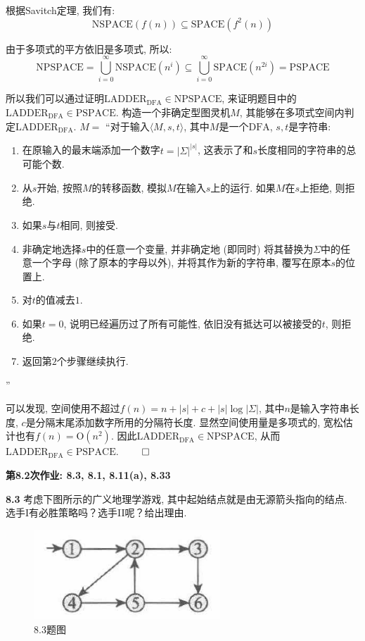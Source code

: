 \documentclass[UTF8]{report}
\newcommand{\problem}[1]{{\setlength{\parskip}{10pt}\noindent \bf{#1}}}
\renewenvironment{proof}{{\setlength{\parskip}{7pt}\noindent\hskip 2em \bf 证明 \quad}}{\hfill$\qed$\par}
\newcommand{\SPACE}{\mathrm{SPACE}}
\newcommand{\NSPACE}{\mathrm{NSPACE}}
\newcommand{\PSPACE}{\mathrm{PSPACE}}
\newcommand{\NPSPACE}{\mathrm{NPSPACE}}
\newcommand{\DFA}{\mathrm{DFA}}
\renewcommand{\O}{\mathrm{O}}
\newcommand{\LADDER}{\mathrm{LADDER_{DFA}}}
\begin{document}
\begin{proof}
    根据Savitch定理, 我们有:
    \[
        \NSPACE(f(n)) \subseteq \SPACE(f^2(n))
    \]

    由于多项式的平方依旧是多项式, 所以:
    \[
        \NPSPACE = \bigcup_{i=0}^{\infty} \NSPACE(n^i) \subseteq \bigcup_{i=0}^{\infty} \SPACE(n^{2i}) = \PSPACE
    \]

    所以我们可以通过证明$\LADDER \in \NPSPACE$, 来证明题目中的$\LADDER \in \PSPACE$. 构造一个非确定型图灵机$M$, 其能够在多项式空间内判定$\LADDER$. $M =$ ``对于输入$\langle M,s,t \rangle$, 其中$M$是一个$\DFA$, $s,t$是字符串:
    \begin{enumerate}
        \item 在原输入的最末端添加一个数字$t = |\Sigma|^{|s|}$, 这表示了和$s$长度相同的字符串的总可能个数.
        \item 从$s$开始, 按照$M$的转移函数, 模拟$M$在输入$s$上的运行. 如果$M$在$s$上拒绝, 则拒绝.
        \item 如果$s$与$t$相同, 则接受.
        \item 非确定地选择$s$中的任意一个变量, 并非确定地 (即同时) 将其替换为$\Sigma$中的任意一个字母 (除了原本的字母以外), 并将其作为新的字符串, 覆写在原本$s$的位置上.
        \item 对$t$的值减去$1$.
        \item 如果$t=0$, 说明已经遍历过了所有可能性, 依旧没有抵达可以被接受的$t$, 则拒绝.
        \item 返回第$2$个步骤继续执行.
    \end{enumerate}
    ''

    可以发现, 空间使用不超过$f(n) = n + |s| + c + |s|\log |\Sigma|$, 其中$n$是输入字符串长度, $c$是分隔末尾添加数字所用的分隔符长度. 显然空间使用量是多项式的, 宽松估计也有$f(n) = \O(n^2)$. 因此$\LADDER \in \NPSPACE$, 从而$\LADDER \in \PSPACE$.
\end{proof}




\newpage

\textbf{第8.2次作业: 8.3, 8.1, 8.11(a), 8.33}

\problem{8.3} 考虑下图所示的广义地理学游戏, 其中起始结点就是由无源箭头指向的结点. 选手I有必胜策略吗？选手II呢？给出理由. 

\begin{figure}[!htbp]
    \centering
    \includegraphics[width=7cm]{image/8.3.png}
    \caption{8.3题图}
    \label{fig:8_3}
\end{figure}
\end{document}
